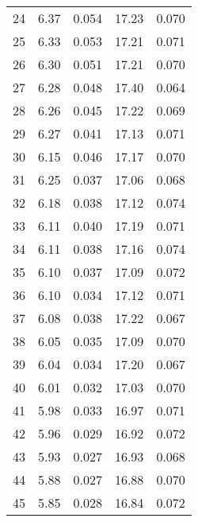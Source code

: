 \begin{table}
\begin{tabular}{c|ll|ll}
24 & 6.37 & 0.054 & 17.23 & 0.070 \\
25 & 6.33 & 0.053 & 17.21 & 0.071 \\
26 & 6.30 & 0.051 & 17.21 & 0.070 \\
27 & 6.28 & 0.048 & 17.40 & 0.064 \\
28 & 6.26 & 0.045 & 17.22 & 0.069 \\
29 & 6.27 & 0.041 & 17.13 & 0.071 \\
30 & 6.15 & 0.046 & 17.17 & 0.070 \\
31 & 6.25 & 0.037 & 17.06 & 0.068 \\
32 & 6.18 & 0.038 & 17.12 & 0.074 \\
33 & 6.11 & 0.040 & 17.19 & 0.071 \\
34 & 6.11 & 0.038 & 17.16 & 0.074 \\
35 & 6.10 & 0.037 & 17.09 & 0.072 \\
36 & 6.10 & 0.034 & 17.12 & 0.071 \\
37 & 6.08 & 0.038 & 17.22 & 0.067 \\
38 & 6.05 & 0.035 & 17.09 & 0.070 \\
39 & 6.04 & 0.034 & 17.20 & 0.067 \\
40 & 6.01 & 0.032 & 17.03 & 0.070 \\
41 & 5.98 & 0.033 & 16.97 & 0.071 \\
42 & 5.96 & 0.029 & 16.92 & 0.072 \\
43 & 5.93 & 0.027 & 16.93 & 0.068 \\
44 & 5.88 & 0.027 & 16.88 & 0.070 \\
45 & 5.85 & 0.028 & 16.84 & 0.072 \\
               \hline
        \end{tabular}
    \end{table}
    \clearpage

